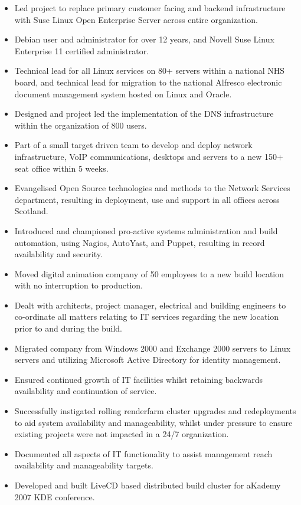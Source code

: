 \documentclass[10pt]{report}
\begin{document}
\begin{itemize}
\item Led project to replace primary customer facing and backend infrastructure with Suse Linux Open Enterprise Server across entire organization.
\item Debian user and administrator for over 12 years, and Novell Suse Linux Enterprise 11 certified administrator.
\item Technical lead for all Linux services on 80+ servers within a national NHS board, and technical lead for migration to the national Alfresco electronic document management system hosted on Linux and Oracle.
\item Designed and project led the implementation of the DNS infrastructure within the organization of 800 users.
\item Part of a small target driven team to develop and deploy network infrastructure, VoIP communications, desktops and servers to a new 150+ seat office within 5 weeks.
\item Evangelised Open Source technologies and methods to the Network Services department, resulting in deployment, use and support in all offices across Scotland.
\item Introduced and championed pro-active systems administration and build automation, using Nagios, AutoYast, and Puppet, resulting in record availability and security.
\item Moved digital animation company of 50 employees to a new build location with no interruption to production.
\item Dealt with architects, project manager, electrical and building engineers to co-ordinate all matters relating to IT services regarding the new location prior to and during the build.
\item Migrated company from Windows 2000 and Exchange 2000 servers to Linux servers and utilizing Microsoft Active Directory for identity management.
\item Ensured continued growth of IT facilities whilst retaining backwards availability and continuation of service.
\item Successfully instigated rolling renderfarm cluster upgrades and redeployments to aid system availability and manageability, whilst under pressure to ensure existing projects were not impacted in a 24/7 organization.
\item Documented all aspects of IT functionality to assist management reach availability and manageability targets.
\item Developed and built LiveCD based distributed build cluster for aKademy 2007 KDE conference.
\end{itemize}
\end{document}
